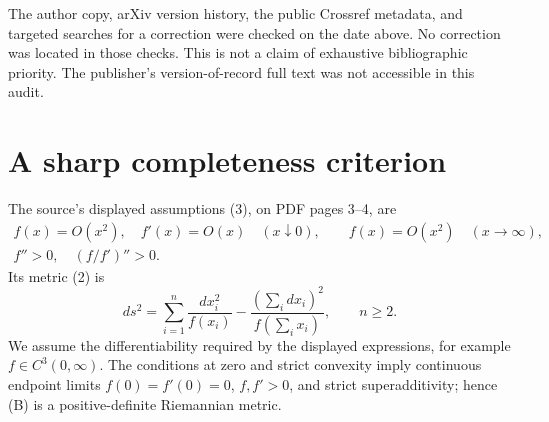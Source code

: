 \documentclass[11pt,a4paper]{article}
\begin{document}
The author copy, arXiv version history, the public Crossref metadata,
and targeted searches for a correction were checked on the date above.
No correction was located in those checks. This is not a claim of
exhaustive bibliographic priority. The publisher's version-of-record
full text was not accessible in this audit.

\section{A sharp completeness criterion}
The source's displayed assumptions (3), on PDF pages 3--4, are
\[
 \begin{gathered}
 f(x)=O(x^2),\quad f'(x)=O(x)\quad(x\downarrow0),\qquad
 f(x)=O(x^2)\quad(x\to\infty),\\
 f''>0,\quad (f/f')''>0.
 \end{gathered}
\tag{A}
\]
Its metric (2) is
\[
 ds^2=\sum_{i=1}^n\frac{dx_i^2}{f(x_i)}
       -\frac{(\sum_i dx_i)^2}{f(\sum_i x_i)},\qquad n\ge2.
\tag{B}
\]
We assume the differentiability required by the displayed expressions,
for example $f\in C^3(0,\infty)$. The conditions at zero and strict
convexity imply continuous endpoint limits $f(0)=f'(0)=0$, $f,f'>0$, and strict superadditivity;
hence (B) is a positive-definite Riemannian metric.
\end{document}
